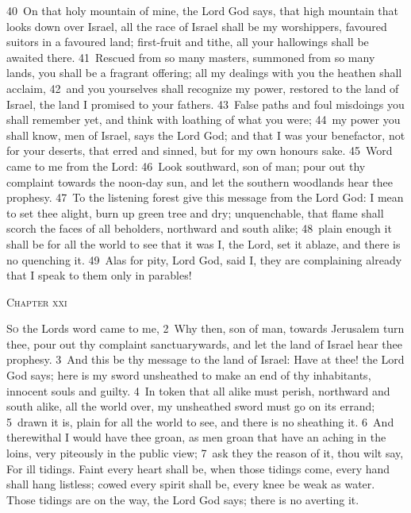 \documentclass[10pt]{book} %
\begin{document}
\textcolor{benred8}{40}~On that holy mountain of mine, the Lord God says, that high mountain that looks down over Israel, all the race of Israel shall be my worshippers, favoured suitors in a favoured land; first-fruit and tithe, all your hallowings shall be awaited there. \textcolor{benred8}{41}~Rescued from so many masters, summoned from so many lands, you shall be a fragrant offering; all my dealings with you the heathen shall acclaim, \textcolor{benred8}{42}~and you yourselves shall recognize my power, restored to the land of Israel, the land I promised to your fathers. \textcolor{benred8}{43}~False paths and foul misdoings you shall remember yet, and think with loathing of what you were; \textcolor{benred8}{44}~my power you shall know, men of Israel, says the Lord God; and that I was your benefactor, not for your deserts, that erred and sinned, but for my own honour\textquotesingle s sake.
\textcolor{benred8}{45}~Word came to me from the Lord: \textcolor{benred8}{46}~Look southward, son of man; pour out thy complaint towards the noon-day sun, and let the southern woodlands hear thee prophesy. \textcolor{benred8}{47}~To the listening forest give this message from the Lord God: I mean to set thee alight, burn up green tree and dry; unquenchable, that flame shall scorch the faces of all beholders, northward and south alike; \textcolor{benred8}{48}~plain enough it shall be for all the world to see that it was I, the Lord, set it ablaze, and there is no quenching it.
\textcolor{benred8}{49}~Alas for pity, Lord God, said I, they are complaining already that I speak to them only in parables!
\begin{large}\begin{center}\textsc{Chapter xxi}\end{center}\end{large}
\lettrine[lines=2]{S}{o} the Lord\textquotesingle s word came to me, \textcolor{benred8}{2}~Why then, son of man, towards Jerusalem turn thee, pour out thy complaint sanctuarywards, and let the land of Israel hear thee prophesy. \textcolor{benred8}{3}~And this be thy message to the land of Israel: Have at thee! the Lord God says; here is my sword unsheathed to make an end of thy inhabitants, innocent souls and guilty. \textcolor{benred8}{4}~In token that all alike must perish, northward and south alike, all the world over, my unsheathed sword must go on its errand; \textcolor{benred8}{5}~drawn it is, plain for all the world to see, and there is no sheathing it. \textcolor{benred8}{6}~And therewithal I would have thee groan, as men groan that have an aching in the loins, very piteously in the public view; \textcolor{benred8}{7}~ask they the reason of it, thou wilt say, For ill tidings. Faint every heart shall be, when those tidings come, every hand shall hang listless; cowed every spirit shall be, every knee be weak as water. Those tidings are on the way, the Lord God says; there is no averting it.
\end{document}
